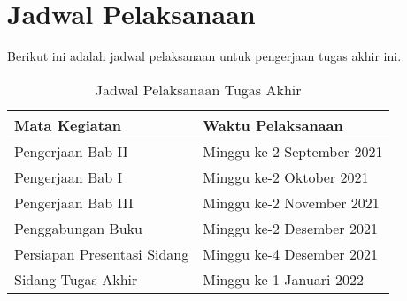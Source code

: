 \section{Jadwal Pelaksanaan}

Berikut ini adalah jadwal pelaksanaan untuk pengerjaan tugas akhir ini.

\begin{table}[h]
  \centering
  \begin{tabular}{ |p{5cm}|p{5cm}| }
    \hline
    Mata Kegiatan & Waktu Pelaksanaan \\
    \hline
    Pengerjaan Bab II & Minggu ke-2 September 2021  \\
    Pengerjaan Bab I & Minggu ke-2 Oktober 2021  \\
    Pengerjaan Bab III & Minggu ke-2 November 2021  \\
    Penggabungan Buku & Minggu ke-2 Desember 2021  \\
    Persiapan Presentasi Sidang & Minggu ke-4 Desember 2021  \\
    Sidang Tugas Akhir & Minggu ke-1 Januari 2022  \\

    \hline
  \end{tabular}
  \caption{Jadwal Pelaksanaan Tugas Akhir}
  \label{table:1}
\end{table}